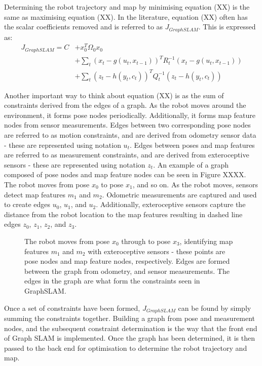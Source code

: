 \documentclass[a4paper]{article}
\begin{document}
Determining the robot trajectory and map by minimising equation (XX) is the same as maximising equation (XX). In the literature, equation (XX) often has the scalar coefficients removed and is referred to as $J_{GraphSLAM}$. This is expressed as:
\begin{align}
J_{GraphSLAM} = C &+ x_0^T \Omega_0 x_0 \nonumber \\ &+ \sum_{t} (x_t - g(u_t, x_{t-1}))^T R_t^{-1} (x_t - g(u_t, x_{t-1})) \nonumber \\ &+ \sum_{t} (z_t - h(y_t,c_t))^T Q_t^{-1} (z_t - h(y_t,c_t))
\end{align}

Another important way to think about equation (XX) is as the sum of constraints derived from the edges of a graph. As the robot moves around the environment, it forms pose nodes periodically. Additionally, it forms map feature nodes from sensor measurements. Edges between two corresponding pose nodes are referred to as motion constraints, and are derived from odometry sensor data - these are represented using notation $u_t$. Edges between poses and map features are referred to as measurement constraints, and are derived from exteroceptive sensors - these are represented using notation $z_t$. An example of a graph composed of pose nodes and map feature nodes can be seen in Figure XXXX. The robot moves from pose $x_0$ to pose $x_1$, and so on. As the robot moves, sensors detect map features $m_1$ and $m_2$. Odometric measurements are captured and used to create edges $u_0$, $u_1$, and $u_2$. Additionally, exteroceptive sensors capture the distance from the robot location to the map features resulting in dashed line edges $z_0$, $z_1$, $z_2$, and $z_3$.
\begin{figure}[h]
\centering

\caption{The robot moves from pose $x_0$ through to pose $x_3$, identifying map features $m_1$ and $m_2$ with exteroceptive sensors - these points are pose nodes and map feature nodes, respectively. Edges are formed between the graph from odometry, and sensor measurements. The edges in the graph are what form the constraints seen in GraphSLAM.}
\end{figure}

Once a set of constraints have been formed, $J_{GraphSLAM}$ can be found by simply summing the constraints together. Building a graph from pose and measurement nodes, and the subsequent constraint determination is the way that the front end of Graph SLAM is implemented. Once the graph has been determined, it is then passed to the back end for optimisation to determine the robot trajectory and map.
\end{document}
